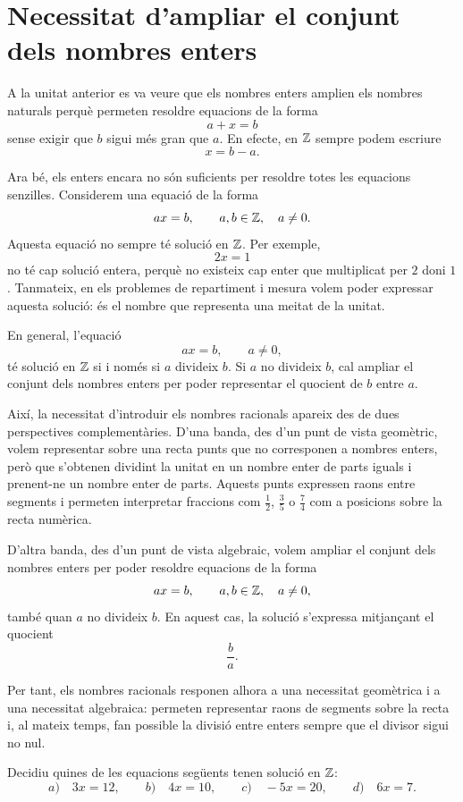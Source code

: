 \section{Necessitat d'ampliar el conjunt dels nombres enters}

A la unitat anterior es va veure que els nombres enters amplien els nombres naturals perquè permeten resoldre equacions de la forma
\[
a+x=b
\]
sense exigir que \(b\) sigui més gran que \(a\). En efecte, en \(\mathbb{Z}\) sempre podem escriure
\[
x=b-a.
\]

Ara bé, els enters encara no són suficients per resoldre totes les equacions senzilles. Considerem una equació de la forma
\[
ax=b,
\qquad a,b\in\mathbb{Z},\quad a\neq0.
\]
Aquesta equació no sempre té solució en \(\mathbb{Z}\). Per exemple,
\[
2x=1
\]
no té cap solució entera, perquè no existeix cap enter que multiplicat per \(2\) doni \(1\). Tanmateix, en els problemes de repartiment i mesura volem poder expressar aquesta solució: és el nombre que representa una meitat de la unitat.

En general, l'equació
\[
ax=b,
\qquad a\neq0,
\]
té solució en \(\mathbb{Z}\) si i només si \(a\) divideix \(b\). Si \(a\) no divideix \(b\), cal ampliar el conjunt dels nombres enters per poder representar el quocient de \(b\) entre \(a\).

Així, la necessitat d'introduir els nombres racionals apareix des de dues perspectives complementàries. D'una banda, des d'un punt de vista geomètric, volem representar sobre una recta punts que no corresponen a nombres enters, però que s'obtenen dividint la unitat en un nombre enter de parts iguals i prenent-ne un nombre enter de parts. Aquests punts expressen raons entre segments i permeten interpretar fraccions com \(\frac{1}{2}\), \(\frac{3}{5}\) o \(\frac{7}{4}\) com a posicions sobre la recta numèrica.

D'altra banda, des d'un punt de vista algebraic, volem ampliar el conjunt dels nombres enters per poder resoldre equacions de la forma
\[
ax=b,
\qquad a,b\in\mathbb{Z},\quad a\neq0,
\]
també quan \(a\) no divideix \(b\). En aquest cas, la solució s'expressa mitjançant el quocient
\[
\frac{b}{a}.
\]

Per tant, els nombres racionals responen alhora a una necessitat geomètrica i a una necessitat algebraica: permeten representar raons de segments sobre la recta i, al mateix temps, fan possible la divisió entre enters sempre que el divisor sigui no nul.


\begin{exemple}
	Decidiu quines de les equacions següents tenen solució en \(\mathbb{Z}\):
	\[
	a)\quad 3x=12,
	\qquad
	b)\quad 4x=10,
	\qquad
	c)\quad -5x=20,
	\qquad
	d)\quad 6x=7.
	\]
\end{exemple}

